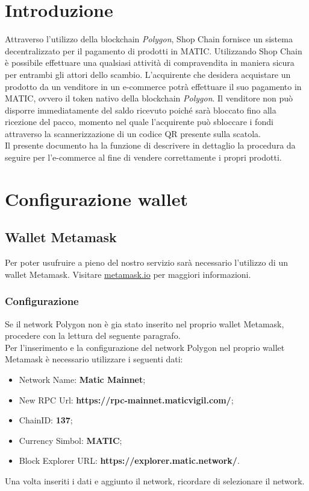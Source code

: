 \documentclass[a4paper, 12pt]{article}
\begin{document}
\makefrontpage
\makeversioni
\tableofcontents
\newpage

\section{Introduzione}
Attraverso l'utilizzo della blockchain \textit{Polygon}, Shop Chain fornisce un sistema decentralizzato per il pagamento di prodotti in MATIC. Utilizzando Shop Chain è possibile effettuare una qualsiasi attività di compravendita in maniera sicura per entrambi gli attori dello scambio. L'acquirente che desidera acquistare un prodotto da un venditore in un e-commerce potrà effettuare il suo pagamento in MATIC, ovvero il token nativo della blockchain \textit{Polygon}. Il venditore non può disporre immediatamente del saldo ricevuto poiché sarà bloccato fino alla ricezione del pacco, momento nel quale l'acquirente può sbloccare i fondi attraverso la scannerizzazione di un codice QR presente sulla scatola.
\\Il presente documento ha la funzione di descrivere in dettaglio la procedura da seguire per l'e-commerce al fine di vendere correttamente i propri prodotti.

\section{Configurazione wallet}
\subsection{Wallet Metamask}
Per poter usufruire a pieno del nostro servizio sarà necessario l'utilizzo di un wallet Metamask. Visitare \href{https://www.metamask.io}{metamask.io} per maggiori informazioni.
\subsubsection{Configurazione}
Se il network Polygon non è gia stato inserito nel proprio wallet Metamask, procedere con la lettura del seguente paragrafo.
\\Per l'inserimento e la configurazione del network Polygon nel proprio wallet Metamask è necessario utilizzare i seguenti dati:
\begin{itemize}
\item Network Name: \textbf{Matic Mainnet};
\item New RPC Url: \textbf{https://rpc-mainnet.maticvigil.com/};
\item ChainID: \textbf{137};
\item Currency Simbol: \textbf{MATIC};
\item Block Explorer URL: \textbf{https://explorer.matic.network/}.
\end{itemize}
Una volta inseriti i dati e aggiunto il network, ricordare di selezionare il network.
\end{document}
